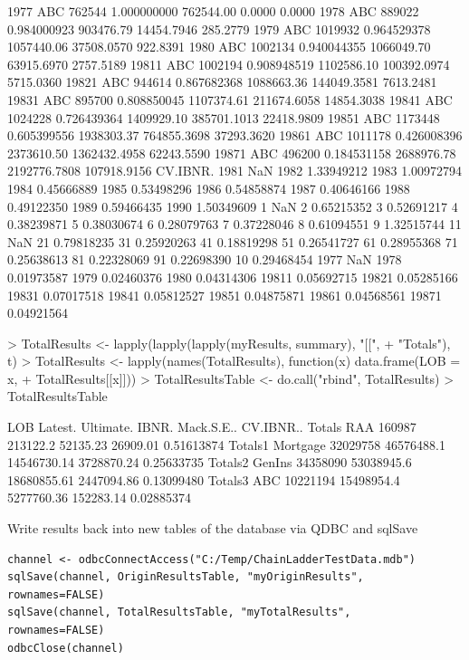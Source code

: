 \documentclass[a4paper]{article}
\begin{document}
\begin{Schunk}
\begin{Soutput}
1977       ABC  762544 1.000000000  762544.00       0.0000       0.0000
1978       ABC  889022 0.984000923  903476.79   14454.7946     285.2779
1979       ABC 1019932 0.964529378 1057440.06   37508.0570     922.8391
1980       ABC 1002134 0.940044355 1066049.70   63915.6970    2757.5189
19811      ABC 1002194 0.908948519 1102586.10  100392.0974    5715.0360
19821      ABC  944614 0.867682368 1088663.36  144049.3581    7613.2481
19831      ABC  895700 0.808850045 1107374.61  211674.6058   14854.3038
19841      ABC 1024228 0.726439364 1409929.10  385701.1013   22418.9809
19851      ABC 1173448 0.605399556 1938303.37  764855.3698   37293.3620
19861      ABC 1011178 0.426008396 2373610.50 1362432.4958   62243.5590
19871      ABC  496200 0.184531158 2688976.78 2192776.7808  107918.9156
        CV.IBNR.
1981         NaN
1982  1.33949212
1983  1.00972794
1984  0.45666889
1985  0.53498296
1986  0.54858874
1987  0.40646166
1988  0.49122350
1989  0.59466435
1990  1.50349609
1            NaN
2     0.65215352
3     0.52691217
4     0.38239871
5     0.38030674
6     0.28079763
7     0.37228046
8     0.61094551
9     1.32515744
11           NaN
21    0.79818235
31    0.25920263
41    0.18819298
51    0.26541727
61    0.28955368
71    0.25638613
81    0.22328069
91    0.22698390
10    0.29468454
1977         NaN
1978  0.01973587
1979  0.02460376
1980  0.04314306
19811 0.05692715
19821 0.05285166
19831 0.07017518
19841 0.05812527
19851 0.04875871
19861 0.04568561
19871 0.04921564
\end{Soutput}
\begin{Sinput}
> TotalResults <- lapply(lapply(lapply(myResults, summary), "[[", 
+     "Totals"), t)
> TotalResults <- lapply(names(TotalResults), function(x) data.frame(LOB = x, 
+     TotalResults[[x]]))
> TotalResultsTable <- do.call("rbind", TotalResults)
> TotalResultsTable
\end{Sinput}
\begin{Soutput}
             LOB  Latest.  Ultimate.       IBNR. Mack.S.E..  CV.IBNR..
Totals       RAA   160987   213122.2    52135.23   26909.01 0.51613874
Totals1 Mortgage 32029758 46576488.1 14546730.14 3728870.24 0.25633735
Totals2   GenIns 34358090 53038945.6 18680855.61 2447094.86 0.13099480
Totals3      ABC 10221194 15498954.4  5277760.36  152283.14 0.02885374
\end{Soutput}
\end{Schunk}

Write results back into new tables of the database via QDBC and sqlSave

\begin{verbatim}
channel <- odbcConnectAccess("C:/Temp/ChainLadderTestData.mdb")
sqlSave(channel, OriginResultsTable, "myOriginResults",
rownames=FALSE)
sqlSave(channel, TotalResultsTable, "myTotalResults",
rownames=FALSE)
odbcClose(channel)
\end{verbatim}
\end{document}
